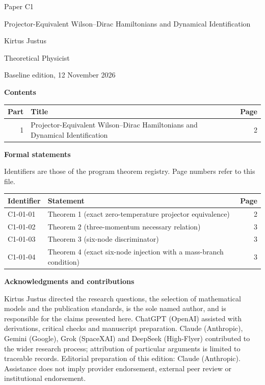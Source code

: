\documentclass[11pt,a4paper]{article}
\begin{document}
\thispagestyle{empty}\pagestyle{empty}
{\small\sffamily \ProgramTitle\hfill Paper C1\par}
\vspace*{12mm}
{\LARGE\bfseries\raggedright{} Projector-Equivalent Wilson–Dirac Hamiltonians and Dynamical Identification\par}
\vspace{9mm}
{\large Kirtus Justus\par}\vspace{1mm}Theoretical Physicist\par\AuthorLocation\par\vspace{2mm}Baseline edition, 12 November 2026\par\vspace{8mm}
\textbf{Contents}\par\vspace{1mm}
{\small\begin{longtable}{@{}r>{\raggedright\arraybackslash}p{}r@{}}
\toprule Part & Title & Page\\\midrule\endhead
1 & Projector-Equivalent Wilson–Dirac Hamiltonians and Dynamical Identification & 2\\
\bottomrule\end{longtable}}
\vspace{2mm}\textbf{Formal statements}\par\vspace{1mm}
{\footnotesize Identifiers are those of the program theorem registry. Page numbers refer to this file.\par}
{\footnotesize\begin{longtable}{@{}l>{\raggedright\arraybackslash}p{}r@{}}
\toprule Identifier & Statement & Page\\\midrule\endhead
C1-01-01 & Theorem 1 (exact zero-temperature projector equivalence) & 2\\
C1-01-02 & Theorem 2 (three-momentum necessary relation) & 3\\
C1-01-03 & Theorem 3 (six-node discriminator) & 3\\
C1-01-04 & Theorem 4 (exact six-node injection with a mass-branch condition) & 3\\
\bottomrule\end{longtable}}
\vspace{3mm}\textbf{Acknowledgments and contributions}\par
{\small Kirtus Justus directed the research questions, the selection of mathematical models and the publication standards, is the sole named author, and is responsible for the claims presented here. ChatGPT (OpenAI) assisted with derivations, critical checks and manuscript preparation. Claude (Anthropic), Gemini (Google), Grok (SpaceXAI) and DeepSeek (High-Flyer) contributed to the wider research process; attribution of particular arguments is limited to traceable records. Editorial preparation of this edition: Claude (Anthropic). Assistance does not imply provider endorsement, external peer review or institutional endorsement.\par}
\end{document}
